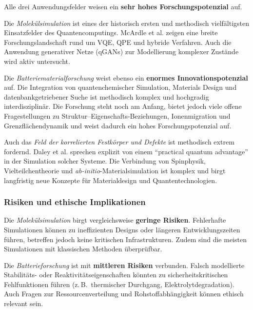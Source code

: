 Alle drei Anwendungsfelder weisen ein \textbf{sehr hohes Forschungspotenzial} auf.

\vspace{0.5em}

Die \textit{Molekülsimulation} ist eines der historisch ersten und methodisch vielfältigsten Einsatzfelder des Quantencomputings. McArdle et al. zeigen eine breite Forschungslandschaft rund um VQE, QPE und hybride Verfahren. \cite{mcardle_quantum_2020} Auch die Anwendung generativer Netze (qGANs) zur Modellierung komplexer Zustände wird aktiv untersucht. \cite{zoufal_quantum_2019}

\vspace{0.5em}

Die \textit{Batteriematerialforschung} weist ebenso ein \textbf{enormes Innovationspotenzial} auf. Die Integration von quantenchemischer Simulation, Materials Design und datenbankgetriebener Suche ist methodisch komplex und hochgradig interdisziplinär. \cite{urban_computational_2016} Die Forschung steht noch am Anfang, bietet jedoch viele offene Fragestellungen zu Struktur–Eigenschafts-Beziehungen, Ionenmigration und Grenzflächendynamik und weist dadurch ein hohes Forschungspotenzial auf.

\vspace{0.5em}

Auch das \textit{Feld der korrelierten Festkörper und Defekte} ist methodisch extrem fordernd. Daley et al. sprechen explizit von einem ``practical quantum advantage'' \cite{daley_practical_2022} in der Simulation solcher Systeme. Die Verbindung von Spinphysik, Vielteilchentheorie und \textit{ab-initio}-Materialsimulation ist komplex und birgt langfristig neue Konzepte für Materialdesign und Quantentechnologien. \cite{bassett_quantum_2019}


\subsubsection{Risiken und ethische Implikationen}

Die \textit{Molekülsimulation} birgt vergleichsweise \textbf{geringe Risiken}. Fehlerhafte Simulationen können zu ineffizienten Designs oder längeren Entwicklungszeiten führen, betreffen jedoch keine kritischen Infrastrukturen. Zudem sind die meisten Simulationen mit klassischen Methoden überprüfbar. \cite{mcardle_quantum_2020}

\vspace{0.5em}

Die \textit{Batterieforschung} ist mit \textbf{mittleren Risiken} verbunden. Falsch modellierte Stabilitäts- oder Reaktivitätseigenschaften könnten zu sicherheitskritischen Fehlfunktionen führen (z.\,B.\ thermischer Durchgang, Elektrolytdegradation). Auch Fragen zur Ressourcenverteilung und Rohstoffabhängigkeit können ethisch relevant sein. \cite{demirApplicationQuantumComputing2024}

